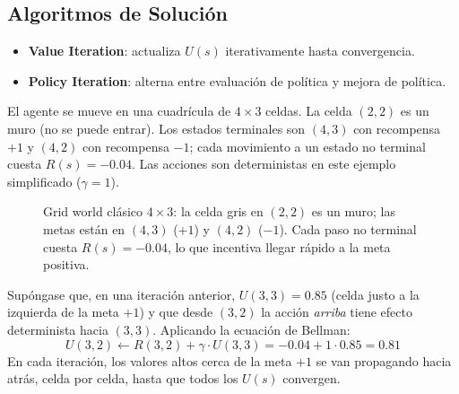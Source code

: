 \subsection{Algoritmos de Solución}

\begin{itemize}
    \item \textbf{Value Iteration}: actualiza $U(s)$ iterativamente hasta convergencia.
    \item \textbf{Policy Iteration}: alterna entre evaluación de política y mejora de política.
\end{itemize}

\begin{example}
    El agente se mueve en una cuadrícula de $4\times 3$ celdas. La celda $(2,2)$ es un muro (no se puede entrar). Los
    estados terminales son $(4,3)$ con recompensa $+1$ y $(4,2)$ con recompensa $-1$; cada movimiento a un estado no
    terminal cuesta $R(s)=-0.04$. Las acciones son deterministas en este ejemplo simplificado ($\gamma=1$).
\end{example}

\begin{figure}[H]
\centering
{}
\caption{Grid world clásico $4\times 3$: la celda gris en $(2,2)$ es un muro; las metas están en $(4,3)$ ($+1$) y
$(4,2)$ ($-1$). Cada paso no terminal cuesta $R(s)=-0.04$, lo que incentiva llegar rápido a la meta positiva.}
\end{figure}

\begin{example}
    Supóngase que, en una iteración anterior, $U(3,3)=0.85$ (celda justo a la izquierda de la meta $+1$) y que desde
    $(3,2)$ la acción \textit{arriba} tiene efecto determinista hacia $(3,3)$. Aplicando la ecuación de Bellman:
    \[
        U(3,2) \leftarrow R(3,2) + \gamma \cdot U(3,3) = -0.04 + 1 \cdot 0.85 = 0.81
    \]
    En cada iteración, los valores altos cerca de la meta $+1$ se van propagando hacia atrás, celda por celda, hasta
    que todos los $U(s)$ convergen.
\end{example}
